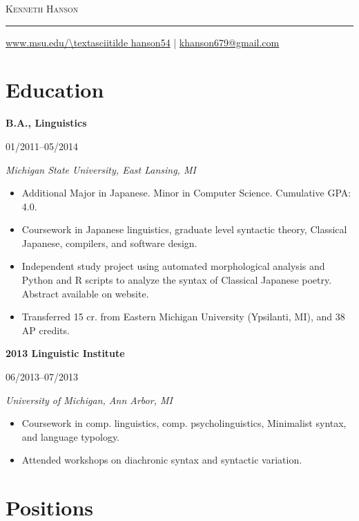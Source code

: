 \documentclass[10pt,oneside]{article}
\makeatletter
\newcommand{\name}{Kenneth Hanson}
\newcommand{\email}{khanson679@gmail.com}
\newcommand{\website}{www.msu.edu/\textasciitilde hanson54}
\newcommand{\bigname}{%
	{\centering\scshape\Huge \name \par}
}
\newcommand{\contactinfo}{%
	{\raggedleft\small \url{\website} | \href{mailto:\email}{\email} \par}
}
\newcommand{\topheading}{%
	\bigname
	\rule{\textwidth}{1pt} \par
	\contactinfo
}
\newcommand{\ressection}[1]{
	\vspace{-12pt}
	\section*{#1}
}
\newcommand{\resbigitem}[4]{
	\item \parbox[t]{0.8\textwidth}{\textbf{#1}} \hfill #2 \\
		\parbox[t]{0.8\textwidth}{\textit{#3}} \hfill \textit{#4}
}
\makeatother
\begin{document}
\topheading

\ressection{Education}

\begin{reslist}
	\resbigitem{B.A., Linguistics}
		{01/2011--05/2014}
		{Michigan State University, East Lansing, MI}
		{}
	\begin{itemize}
		\item Additional Major in Japanese. Minor in Computer Science. Cumulative GPA: 4.0.
		\item Coursework in Japanese linguistics, graduate level syntactic theory, Classical Japanese, compilers, and software design.
		\item Independent study project using automated morphological analysis and Python and R scripts to analyze the syntax of Classical Japanese poetry. Abstract available on website.
		\item Transferred 15 cr. from Eastern Michigan University (Ypsilanti, MI), and 38 AP credits.
	\end{itemize}
	
	\resbigitem{2013 Linguistic Institute}
		{06/2013--07/2013}
		{University of Michigan, Ann Arbor, MI}
		{}
	\begin{itemize}
		\item Coursework in comp. linguistics, comp. psycholinguistics, Minimalist syntax, and language typology.
		\item Attended workshops on diachronic syntax and syntactic variation.
	\end{itemize}
\end{reslist}


\ressection{Positions}
\end{document}
